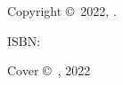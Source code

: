 \singlespacing
\thispagestyle{empty}
\null
\vfill
\singlespacing
{\small\parindent0pt\parskip5pt
\noindent Copyright \copyright\ 2022, \AuthorFull .

\vspace{1ex}

ISBN: \ISBN

\vspace{1ex}

\textit{\TitleFull}

\vspace{1ex}

Cover \copyright\ \Illustrator, 2022}

\clearpage
